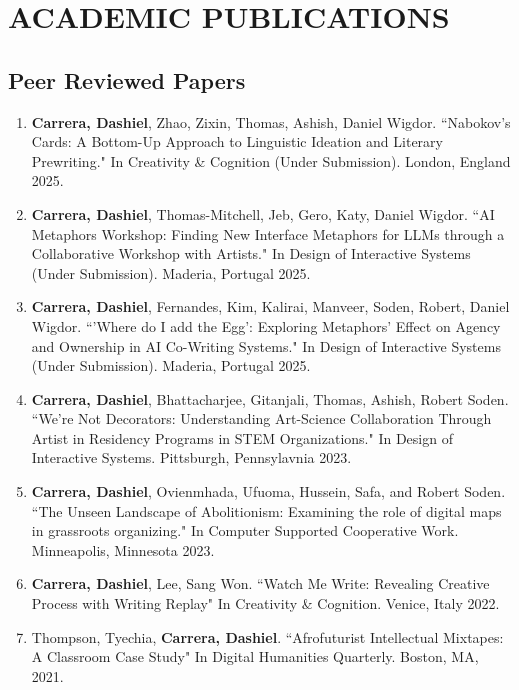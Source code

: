 \section{ACADEMIC PUBLICATIONS}

\subsection{Peer Reviewed Papers}
 \begin{enumerate}
   \item \textbf{Carrera, Dashiel}, Zhao, Zixin, Thomas, Ashish, Daniel Wigdor. ``Nabokov's Cards: A Bottom-Up Approach to Linguistic Ideation and Literary Prewriting." In Creativity  \& Cognition (Under Submission). London, England 2025. \\
    \item \textbf{Carrera, Dashiel}, Thomas-Mitchell, Jeb, Gero, Katy, Daniel Wigdor. ``AI Metaphors Workshop: Finding New Interface Metaphors for LLMs through a Collaborative Workshop with Artists." In Design of Interactive Systems (Under Submission). Maderia, Portugal 2025. \\
     \item \textbf{Carrera, Dashiel}, Fernandes, Kim, Kalirai, Manveer, Soden, Robert, Daniel Wigdor. ``'Where do I add the Egg':  Exploring Metaphors' Effect on Agency and Ownership in AI Co-Writing Systems." In Design of Interactive Systems (Under Submission). Maderia, Portugal 2025. \\
 
 
 
 
  \item \textbf{Carrera, Dashiel}, Bhattacharjee, Gitanjali, Thomas, Ashish, Robert Soden. ``We're Not Decorators: Understanding Art-Science Collaboration Through Artist in Residency Programs in STEM Organizations." In Design of Interactive Systems. Pittsburgh, Pennsylavnia 2023. \\
  \item \textbf{Carrera, Dashiel}, Ovienmhada, Ufuoma, Hussein, Safa, and Robert Soden. ``The Unseen Landscape of Abolitionism: Examining the role of digital maps in
grassroots organizing."  In Computer Supported Cooperative Work. Minneapolis, Minnesota 2023.\\
  \item \textbf{Carrera, Dashiel}, Lee, Sang Won. ``Watch Me Write: Revealing Creative Process with Writing Replay" In Creativity \& Cognition. Venice, Italy 2022. \\
  \item Thompson, Tyechia, \textbf{Carrera, Dashiel}. ``Afrofuturist Intellectual Mixtapes: A Classroom Case Study" In Digital Humanities Quarterly. Boston, MA, 2021.\
 \end{enumerate}

